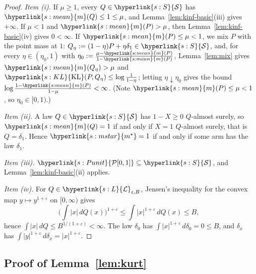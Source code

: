 \documentclass[11pt]{article}
\newcommand{\sy}[2]{{\hyperlink{#1}{#2}}}
\newcommand{\mean}{\sy{s:mean}{m}}
\newcommand{\KL}{\sy{s:KL}{\mathrm{KL}}}
\newcommand{\Punit}{\sy{s:Punit}{\mathcal{P}[0,1]}}
\newcommand{\Semi}{\sy{s:S}{\mathcal{S}}}
\newcommand{\Lmom}{\sy{s:L}{\mathcal{L}}}
\newcommand{\ms}{\sy{s:mstar}{m^{\star}}}
\begin{document}
\begin{proof}
\emph{Item (i).} If $\mu\ge1$, every $Q\in\Semi$ has $\mean(Q)\le1\le\mu$, and
Lemma~\ref{lem:kinf-basic}(iii) gives $+\infty$. If $\mu<1$ and $\mean(P)>\mu$, then
Lemma~\ref{lem:kinf-basic}(iv) gives $0<\infty$. If $\mean(P)\le\mu<1$, we mix $P$ with the point
mass at $1$: $Q_\eta:=(1-\eta)P+\eta\delta_1\in\Semi$, and, for every $\eta\in(\eta_0,1)$ with $\eta_0:=\frac{\mu-\mean(P)}{1-\mean(P)}$, Lemma~\ref{lem:mix}
gives $\mean(Q_\eta)>\mu$ and $\KL(P,Q_\eta)\le\log\frac1{1-\eta}$; letting
$\eta\downarrow\eta_0$ gives the bound $\log\frac{1-\mean(P)}{1-\mu}<\infty$. (Note
$\mean(P)\le\mu<1$, so $\eta_0\in[0,1)$.)

\emph{Item (ii).} A law $Q\in\Semi$ has $1-X\ge0$ $Q$-almost surely, so $\mean(Q)=1$ if and only if
$X=1$ $Q$-almost surely, that is $Q=\delta_1$. Hence $\ms=1$ if and only if some arm has the law
$\delta_1$.

\emph{Item (iii).} $\Punit\subseteq\Semi$, and Lemma~\ref{lem:kinf-basic}(ii) applies.

\emph{Item (iv).} For $Q\in\Lmom_{\varepsilon,B}$, Jensen's inequality for the convex map
$y\mapsto y^{1+\varepsilon}$ on $[0,\infty)$ gives
\begin{equation*}
  \Big(\int|x|\,dQ(x)\Big)^{1+\varepsilon}\le\int|x|^{1+\varepsilon}\,dQ(x)\le B,
\end{equation*}
hence $\int|x|\,dQ\le B^{1/(1+\varepsilon)}<\infty$. The law $\delta_0$ has
$\int|x|^{1+\varepsilon}\,d\delta_0=0\le B$, and $\delta_x$ has $\int|y|^{1+\varepsilon}\,d\delta_x=|x|^{1+\varepsilon}$.
\end{proof}

\subsection{Proof of Lemma~\ref{lem:kurt}}\label{sec:proof-kurt}
\end{document}
